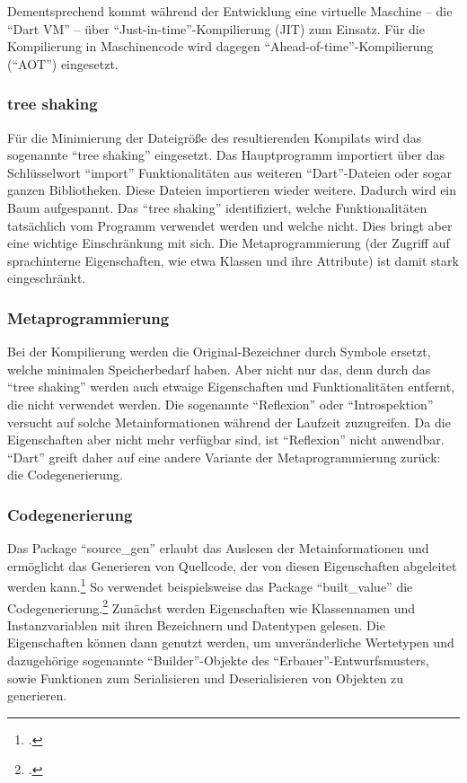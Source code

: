 Dementsprechend kommt während der Entwicklung eine virtuelle Maschine -- die \enquote{Dart VM} -- über \enquote{Just-in-time}-Kompilierung (JIT) zum Einsatz.
Für die Kompilierung in Maschinencode wird dagegen \enquote{Ahead-of-time}-Kompilierung (\enquote{AOT}) eingesetzt.

\subsubsection{tree shaking}
Für die Minimierung der Dateigröße des resultierenden Kompilats wird das sogenannte \enquote{tree shaking} eingesetzt.
Das Hauptprogramm importiert über das Schlüsselwort \enquote{import} Funktionalitäten aus  weiteren \enquote{Dart}-Dateien oder sogar ganzen Bibliotheken.
Diese Dateien importieren wieder weitere.
Dadurch wird ein Baum aufgespannt.
Das \enquote{tree shaking} identifiziert, welche Funktionalitäten tatsächlich vom Programm verwendet werden und welche nicht.
Dies bringt aber eine wichtige Einschränkung mit sich.
Die Metaprogrammierung (der Zugriff auf sprachinterne Eigenschaften, wie etwa Klassen und ihre Attribute) ist damit stark eingeschränkt.

\subsubsection{Metaprogrammierung}
Bei der Kompilierung werden die Original-Bezeichner durch Symbole ersetzt, welche minimalen Speicherbedarf haben.
Aber nicht nur das, denn durch das \enquote{tree shaking} werden auch etwaige Eigenschaften und Funktionalitäten entfernt, die nicht verwendet werden.
Die sogenannte \enquote{Reflexion} oder \enquote{Introspektion} versucht auf solche Metainformationen während der Laufzeit zuzugreifen.
Da die Eigenschaften aber nicht mehr verfügbar sind, ist \enquote{Reflexion} nicht anwendbar.
\enquote{Dart} greift daher auf eine andere Variante der Metaprogrammierung zurück: die Codegenerierung.

\subsubsection{Codegenerierung}
Das Package \enquote{source_gen} erlaubt das Auslesen der Metainformationen und ermöglicht das Generieren von Quellcode, der von diesen Eigenschaften abgeleitet werden kann.\footcite[Vgl.][]{SourceGen}
So verwendet beispielsweise das Package \enquote{built_value} die Codegenerierung.\footcite[Vgl.][]{BuiltValueGenerator}
Zunächst werden Eigenschaften wie Klassennamen und Instanzvariablen mit ihren Bezeichnern und Datentypen gelesen.
Die Eigenschaften können dann genutzt werden, um unveränderliche Wertetypen und dazugehörige sogenannte \enquote{Builder}-Objekte des \enquote{Erbauer}-Entwurfsmusters, sowie Funktionen zum Serialisieren und Deserialisieren von Objekten zu generieren.

